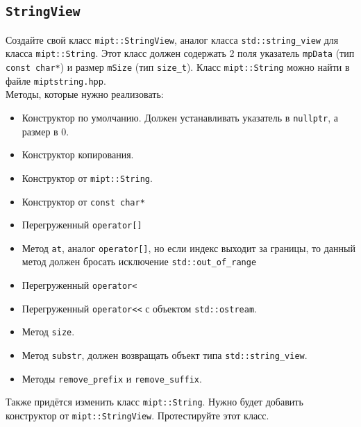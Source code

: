 \documentclass{article}
\begin{document}
\subsection{\texttt{StringView}}
Создайте свой класс \texttt{mipt::StringView}, аналог класса \texttt{std::string\_view} для класса \texttt{mipt::String}.
Этот класс должен содержать 2 поля указатель \texttt{mpData} (тип \texttt{const char*}) и размер \texttt{mSize} (тип \texttt{size\_t}). Класс \texttt{mipt::String} можно найти в файле \texttt{miptstring.hpp}.\\

Методы, которые нужно реализовать:
\begin{itemize}
\item Конструктор по умолчанию. Должен устанавливать указатель в \texttt{nullptr}, а размер в 0.
\item Конструктор копирования.
\item Конструктор от \texttt{mipt::String}.
\item Конструктор от \texttt{const char*}
\item Перегруженный \texttt{operator[]}
\item Метод \texttt{at}, аналог \texttt{operator[]}, но если индекс выходит за границы, то данный метод должен бросать исключение \texttt{std::out\_of\_range}
\item Перегруженный \texttt{operator<}
\item Перегруженный \texttt{operator<{}<} с объектом \texttt{std::ostream}.
\item Метод \texttt{size}.
\item Метод \texttt{substr}, должен возвращать объект типа \texttt{std::string\_view}.
\item Методы \texttt{remove\_prefix} и \texttt{remove\_suffix}.
\end{itemize}

Также придётся изменить класс \texttt{mipt::String}. Нужно будет добавить конструктор от \texttt{mipt::StringView}.
Протестируйте этот класс.
\end{document}
